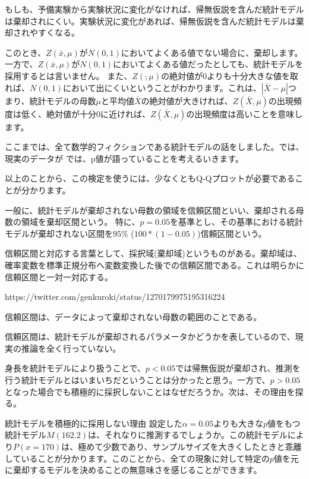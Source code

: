 もしも、予備実験から実験状況に変化がなければ、帰無仮説を含んだ統計モデルは棄却されにくい。実験状況に変化があれば、帰無仮説を含んだ統計モデルは棄却されやすくなる。


\fi







このとき、$Z(\bar{x},\mu)$が$N(0,1)$においてよくある値でない場合に、棄却します。
一方で、$Z(\bar{x},\mu)$が$N(0,1)$においてよくある値だったとしても、統計モデルを採用するとは言いません。
また、$Z(\bar,\mu)$の絶対値が$0$よりも十分大きな値を取れば、$N(0,1)$において出にくいということがわかります。これは、$|\bar{X}-\mu|$つまり、統計モデルの母数$\mu$と平均値$\bar{X}$の絶対値が大きければ、$Z(\bar{X},\mu)$の出現頻度は低く、絶対値が十分$0$に近ければ、$Z(\bar{X},\mu)$の出現頻度は高いことを意味します。

ここまでは、全て数学的フィクションである統計モデルの話をしました。では、現実のデータが
では、p値が語っていることを考えるいきます。


以上のことから、この検定を使うには、少なくともQ-Qプロットが必要であることが分かります。


一般に、統計モデルが棄却されない母数の領域を信頼区間といい、棄却される母数の領域を棄却区間という。
特に、$p=0.05$を基準とし、その基準における統計モデルが棄却されない区間を$95\%$ ($100*(1-0.05)$)信頼区間という。


信頼区間と対応する言葉として、採択域(棄却域)というものがある。棄却域は、確率変数を標準正規分布へ変数変換した後での信頼区間である。これは明らかに信頼区間と一対一対応する。

https://twitter.com/genkuroki/status/1270179975195316224


信頼区間は、データによって棄却されない母数の範囲のことである。

信頼区間は、統計モデルが棄却されるパラメータかどうかを表しているので、現実の推論を全く行っていない。

身長を統計モデルにより扱うことで、$p<0.05$では帰無仮説が棄却され、推測を行う統計モデルとはいまいちだということは分かったと思う。一方で、$p>0.05$となった場合でも積極的に採択しないことはなぜだろうか。次は、その理由を探る。
\fi



\begin{SMbox}{統計モデルを積極的に採用しない理由}
設定した$\alpha=0.05$よりも大きな$p$値をもつ統計モデル$M(162.2)$は、それなりに推測するでしょうか。この統計モデルにより$P(x=170)$は、極めて少数であり、サンプルサイズを大きくしたときと乖離していることが分かります。このことから、全ての現象に対して特定の$p$値を元に棄却するモデルを決めることの無意味さを感じることができます。
\end{SMbox}
\fi


